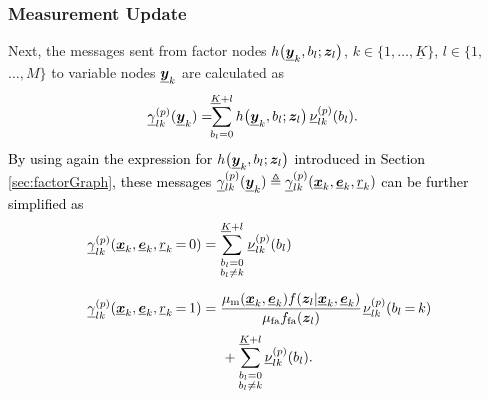 \documentclass[10pt, twoside, romanappendices]{IEEEtran}
\providecommand{\rd}{\textcolor{black}}
\providecommand{\ist}{\hspace*{.3mm}}
\providecommand{\rmv}{\hspace*{-.3mm}}
\providecommand{\nn}{\nonumber}
\begin{document}
\subsubsection{Measurement Update} Next, the messages sent from factor nodes $h\big( \underline{\bm{y}}_{k}, b_{l}; \bm{z}_l \big)$, $k \in \{1,\dots,\underline{K}\}$, $l \in \{1,$ $\dots,M\}$ to variable nodes $\underline{\bm{y}}_{k}$ are calculated \vspace{1mm} as \cite[Eq.~(6)]{KscFreLoe:01}
\begin{align}
\underline{\gamma}^{(p)}_{lk}(\underline{\V{y}}_{k})  &= \rmv\rmv\rmv\rmv\rmv\sum^{\underline{K} + l}_{b_{l} = 0} h\big( \underline{\V{y}}_{k}, b_{l}; \V{z}_l \big)\ist\ist\underline{\nu}_{lk}^{(p)}(b_{l}). \label{eq:gammaLegacy}
\end{align}
\rd{By using again the expression for $h\big( \underline{\bm{y}}_{k}, b_{l}; \bm{z}_l \big)$ introduced in Section \ref{sec:factorGraph}, these messages $\underline{\gamma}^{(p)}_{lk}(\underline{\bm{y}}_{k})\triangleq \underline{\gamma}^{(p)}_{lk}(\underline{\bm{x}}_{k}, \underline{\bm{e}}_{k}, \underline{r}_k)$ can be further simplified \vspace{1mm}as}
\begin{align}
\underline{\gamma}^{(p)}_{lk}(\underline{\V{x}}_{k}, \underline{\V{e}}_{k}, \underline{r}_k \rmv=\rmv 0)  &= \sum^{\underline{K}+ l}_{\substack{b_l=0\\b_l \neq k}} \ist \underline{\nu}_{l k}^{(p)}(b_l)  \nn\\[2mm]
\underline{\gamma}^{(p)}_{lk}(\underline{\V{x}}_{k}, \underline{\V{e}}_{k}, \underline{r}_k \rmv=\rmv 1) &= \frac{\mu_{\mathrm{m}}(\underline{\V{x}}_{k},\underline{\V{e}}_{k}) f(\V{z}_{l}| \underline{\V{x}}_k, \underline{\V{e}}_{k})}{\mu_{\mathrm{fa}}  f_{\mathrm{fa}}(\V{z}_{l})} \ist \underline{\nu}_{l k}^{(p)}(b_{l} \rmv=\rmv k) \nn\\[.8mm]
&\hspace{5mm}+ \sum^{\underline{K}+ l}_{\substack{b_l=0\\b_l \neq k}} \underline{\nu}_{l k}^{(p)}(b_l). \label{eq:gamma1}
\end{align}
\end{document}
